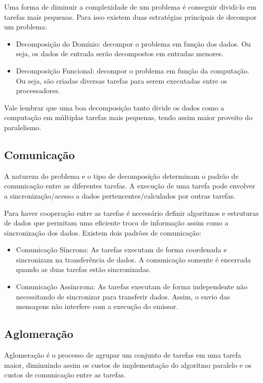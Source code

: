 Uma forma de diminuir a complexidade de um problema é conseguir dividi-lo em tarefas mais pequenas. Para isso existem duas estratégias principais de decompor um problema:

\begin{itemize}
	\item Decomposição do Domínio: decompor o problema em função dos dados. Ou seja, os dados de entrada serão decompostos em entradas menores.
	\item Decomposição Funcional: decompor o problema em função da computação. Ou seja, são criadas diversas tarefas para serem executadas entre os processadores.
\end{itemize}

Vale lembrar que uma boa decomposição tanto divide os dados como a computação em múltiplas tarefas mais pequenas, tendo assim maior proveito do paralelismo.

\subsection{Comunicação}

A natureza do problema e o tipo de decomposição determinam o padrão de comunicação entre as diferentes tarefas. A execução de uma tarefa pode envolver a sincronização/acesso a dados pertencentes/calculados por outras tarefas.

Para haver cooperação entre as tarefas é necessário definir algoritmos e estruturas de dados que permitam uma eficiente troca de informação assim como a sincronização dos dados. Existem dois padrões de comunicação:

\begin{itemize}
	\item Comunicação Síncrona: As tarefas executam de forma coordenada e sincronizam na transferência de dados. A comunicação somente é encerrada quando as duas tarefas estão sincronizadas.
	
	\item Comunicação Assíncrona: As tarefas executam de forma independente não necessitando de sincronizar para transferir dados. Assim, o envio das mensagens não interfere com a execução do emissor.
\end{itemize}

\subsection{Aglomeração}

Aglomeração é o processo de agrupar um conjunto de tarefas em uma tarefa maior, diminuindo assim os custos de implementação do algoritmo paralelo e os custos de comunicação entre as tarefas.

